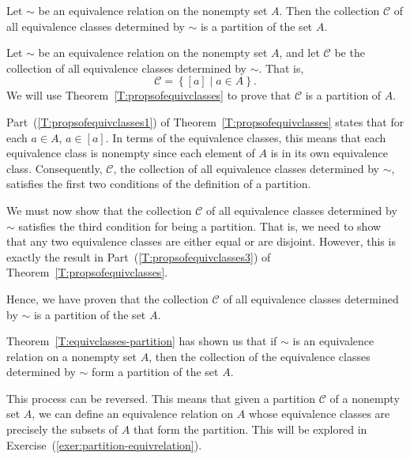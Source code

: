 \begin{theorem}\label{T:equivclasses-partition}
Let  $\sim$  be an equivalence relation on the nonempty set  $A$.  Then the  collection  $\mathcal{C}$  of all equivalence classes determined by  $\sim$  is a partition of the set  $A$.
\end{theorem}
%
\begin{myproof}
Let  $\sim$  be an equivalence relation on the nonempty set  $A$, and let $\mathcal{C}$  be the collection of all equivalence classes determined by  $\sim$.  That is,
\[
\mathcal{C} = \left\{ { {[ a ]} \mid a \in A} \right\}\!.
\]
We will use Theorem~\ref{T:propsofequivclasses} to prove that $\mathcal{C}$  is a partition of  $A$.  

Part~(\ref{T:propsofequivclasses1}) of Theorem~\ref{T:propsofequivclasses} states that for each  $a \in A$,  $a \in [ a ]$.  In terms of the equivalence classes, this means that each equivalence class is nonempty since each element of  $A$  is in its own equivalence class.  Consequently, $\mathcal{C}$, the collection of all equivalence classes determined by  $\sim$, satisfies the first two conditions of the definition of a partition.  

We must now show that the collection $\mathcal{C}$ of all equivalence classes determined by  $\sim$ satisfies the third condition for being a partition. That is, we need to show that any two equivalence classes are either equal or are disjoint.  However, this is exactly the result in Part~(\ref{T:propsofequivclasses3}) of Theorem~\ref{T:propsofequivclasses}.

Hence, we have proven that the collection $\mathcal{C}$ of all equivalence classes determined by  $\sim$ is a partition of the set $A$.
\end{myproof}
%

\noindent
\note  
Theorem~\ref{T:equivclasses-partition} has shown us that if  $\sim$  is an equivalence relation on a nonempty set  $A$, then the collection of the equivalence classes determined by  $\sim$  form a partition of the set  $A$.  

This process can be reversed.  This means that given a partition  $\mathcal{C}$  of a nonempty set  $A$, we can define an equivalence relation on  $A$  whose equivalence classes are precisely the subsets of  $A$  that form the partition.  This will be explored in Exercise~(\ref{exer:partition-equivrelation}).
\hbreak

\endinput





